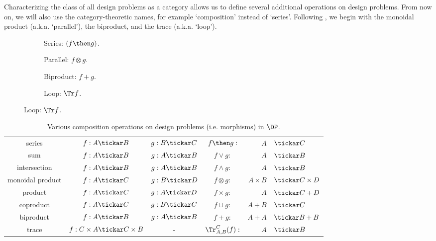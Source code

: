Characterizing the class of all design problems as a category allows us to define several additional operations on design problems. From now on, we will also use the category-theoretic names, for example `composition' instead of `series'. Following \cite{censi16}, we begin with the monoidal product (a.k.a. `parallel'), the biproduct, and the trace (a.k.a. `loop'). %

\begin{figure}[h!]
\centering
\begin{subfigure}{0.2\textwidth}
\centering
{}
\caption{Series: $(f \then g)$.}
\end{subfigure}
\hspace{10mm} %
\begin{subfigure}{0.2\textwidth}
\centering
{}
\caption{Parallel: $f \otimes g$.}
\end{subfigure}
\hspace{10mm} %
\begin{subfigure}{0.2\textwidth}
\centering
{}
\caption{Biproduct: $f + g$.}
\end{subfigure}
\hspace{10mm} %
\begin{subfigure}{0.2\textwidth}
\centering
{}
\caption{Loop: $\Tr f$.}
\end{subfigure}
\label{fig:diagrams}
\end{figure}

\begin{table}[t!]
    \centering
\begin{tabular}{c|c|c|crl}
    series &
    $f:A\tickar B$&
    $g:B\tickar C$&
    $f\then g:$&$A$&$\tickar C$ \\
    sum &
    $f:A\tickar B$ &
    $g:A\tickar B$ &
    $f\vee g:$&$A$&$\tickar B$ \\
    intersection &
    $f:A\tickar B$ &
    $g:A\tickar B$ &
    $f\wedge g:$&$A$&$\tickar B$ \\
    monoidal product &
    $f:A\tickar C$&
    $g:B\tickar D$ &
    $f\otimes g:$&$A\times B$&$\tickar C \times D$ \\
    product &
    $f:A\tickar C$&
    $g:A\tickar D$ &
    $f\times g:$&$A $&$\tickar C + D$ \\
    coproduct &
    $f:A\tickar C$&
    $g:B\tickar C$ &
    $f\sqcup g:$&$A + B $&$\tickar C$ \\
    biproduct &
    $f:A\tickar B$ &
    $g:A\tickar B$ &
    $f+ g:$&$A + A$&$\tickar B + B$ \\
    trace &
    $f: C \times A \tickar C \times B$ &
    -&
    $\Tr_{A,B}^C(f) :$&$A$&$\tickar B$
\end{tabular}
    \caption{Various composition operations on design problems (i.e. morphisms) in $\DP$.}
\end{table}